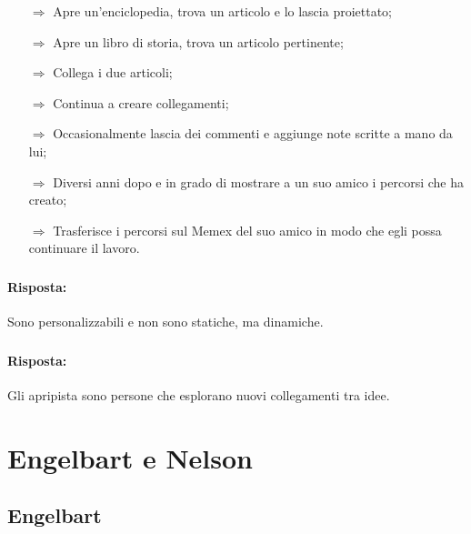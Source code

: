 \begin{itemize}
    \item [$\Rightarrow$] Apre un'enciclopedia, trova un articolo e lo lascia proiettato;
    \item [$\Rightarrow$] Apre un libro di storia, trova un articolo pertinente;
    \item [$\Rightarrow$] Collega i due articoli;
    \item [$\Rightarrow$] Continua a creare collegamenti;
    \item [$\Rightarrow$] Occasionalmente lascia dei commenti e aggiunge note scritte a mano da lui;
    \item [$\Rightarrow$] Diversi anni dopo e in grado di mostrare a un suo amico i percorsi che ha creato;
    \item [$\Rightarrow$] Trasferisce i percorsi sul Memex del suo amico in modo che egli possa continuare il lavoro.
\end{itemize}

\subsubsection{}


\paragraph{Risposta:} Sono personalizzabili e non sono statiche, ma dinamiche.

\subsubsection{}


\paragraph{Risposta:} Gli apripista sono persone che esplorano nuovi collegamenti tra idee.
\pagebreak
\section{Engelbart e Nelson}

\subsection{Engelbart}

